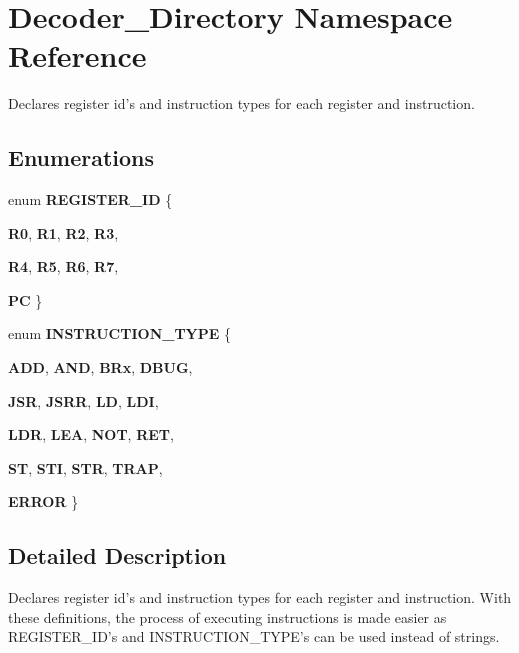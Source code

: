 \hypertarget{namespaceDecoder__Directory}{
\section{Decoder\_\-Directory Namespace Reference}
\label{namespaceDecoder__Directory}
}


Declares register id's and instruction types for each register and instruction.  


\subsection*{Enumerations}
\begin{DoxyCompactItemize}
\item 
enum {\bfseries REGISTER\_\-ID} \{ \par
{\bfseries R0}, 
{\bfseries R1}, 
{\bfseries R2}, 
{\bfseries R3}, 
\par
{\bfseries R4}, 
{\bfseries R5}, 
{\bfseries R6}, 
{\bfseries R7}, 
\par
{\bfseries PC}
 \}
\item 
enum {\bfseries INSTRUCTION\_\-TYPE} \{ \par
{\bfseries ADD}, 
{\bfseries AND}, 
{\bfseries BRx}, 
{\bfseries DBUG}, 
\par
{\bfseries JSR}, 
{\bfseries JSRR}, 
{\bfseries LD}, 
{\bfseries LDI}, 
\par
{\bfseries LDR}, 
{\bfseries LEA}, 
{\bfseries NOT}, 
{\bfseries RET}, 
\par
{\bfseries ST}, 
{\bfseries STI}, 
{\bfseries STR}, 
{\bfseries TRAP}, 
\par
{\bfseries ERROR}
 \}
\end{DoxyCompactItemize}


\subsection{Detailed Description}
Declares register id's and instruction types for each register and instruction. With these definitions, the process of executing instructions is made easier as REGISTER\_\-ID's and INSTRUCTION\_\-TYPE's can be used instead of strings. 